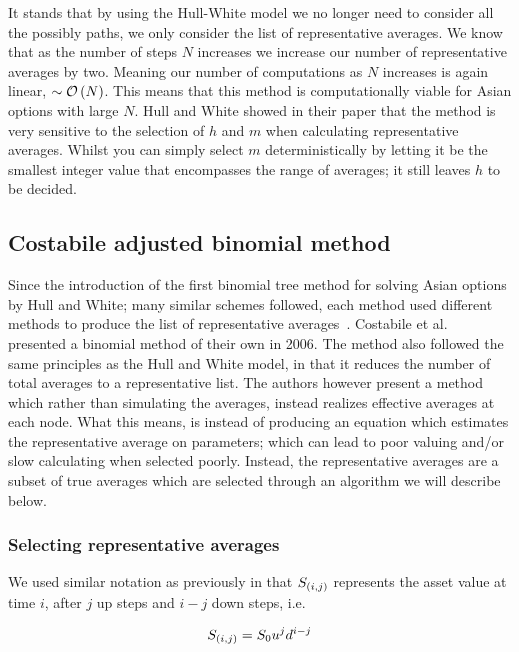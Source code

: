 It stands that by using the Hull-White model we no longer need to consider all the possibly paths, we only consider the list of representative averages. We know that as the number of steps \(N\) increases we increase our number of representative averages by two. Meaning our number of computations as \(N\) increases is again linear, \(\sim\mathcal{O}\left(N\right)\). This means that this method is computationally viable for Asian options with large \(N\).
\nline{}
Hull and White showed in their paper that the method is very sensitive to the selection of \(h\) and \(m\) when calculating representative averages. Whilst you can simply select \(m\) deterministically by letting it be the smallest integer value that encompasses the range of averages; it still leaves \(h\) to be decided.

\subsection{Costabile adjusted binomial method}

Since the introduction of the first binomial tree method for solving Asian options by Hull and White; many similar schemes followed, each method used different methods to produce the list of representative averages~\cite{barraquand1996pricing, chalasani1997accurate, klassen2001simple}. Costabile et al.~\cite{costabile2006adjusted} presented a binomial method of their own in 2006. The method also followed the same principles as the Hull and White model, in that it reduces the number of total averages to a representative list. The authors however present a method which rather than simulating the averages, instead realizes effective averages at each node.
\nline{}
What this means, is instead of producing an equation which estimates the representative average on parameters; which can lead to poor valuing and/or slow calculating when selected poorly. Instead, the representative averages are a subset of true averages which are selected through an algorithm we will describe below.

\subsubsection{Selecting representative averages}

We used similar notation as previously in that \(S_{\left(i,j\right)}\) represents the asset value at time \(i\), after \(j\) up  steps and \(i-j\) down steps, i.e.

\begin{equation*}
    S_{\left(i,j\right)} = S_0u^jd^{i-j}
\end{equation*}

